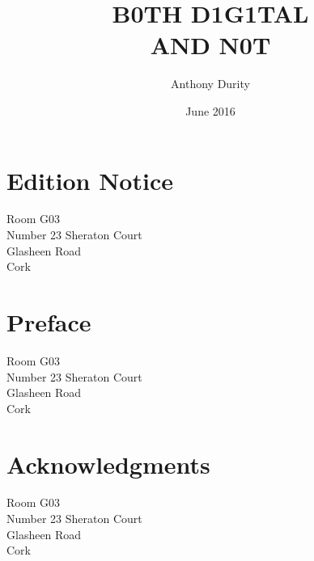 \documentclass[dah,phd,a4paper]{xe_uccthesis}
\begin{document}


\title{B0TH D1G1TAL\\AND N0T}
\subtitle{}
\author{Anthony Durity}
\date{June 2016}
\maketitle

\renewcommand*{\thefootnote}{\fnsymbol{footnote}}

\newpage{}
{}
\section*{Edition Notice}
\begin{flushright}
Room G03\\Number 23 Sheraton Court\\Glasheen Road\\Cork
\end{flushright}



\newpage{}
{}
\section*{Preface}
\begin{flushright}
Room G03\\Number 23 Sheraton Court\\Glasheen Road\\Cork
\end{flushright}

\newpage{}
\section*{Acknowledgments}
\begin{flushright}
Room G03\\Number 23 Sheraton Court\\Glasheen Road\\Cork
\end{flushright}
\end{document}
